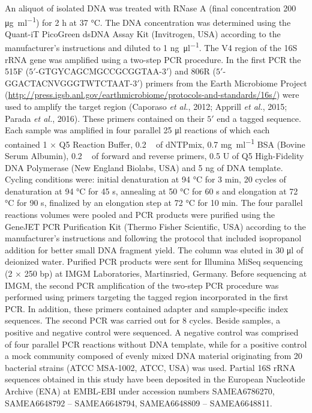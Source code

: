 \documentclass[12pt,]{article}
\begin{document}
An aliquot of isolated DNA was treated with RNase A (final concentration
200 \si{\ug\per\ml}) for 2 \si{\hour} at 37 \si{\degreeCelsius}. The DNA
concentration was determined using the Quant-iT PicoGreen dsDNA Assay
Kit (Invitrogen, USA) according to the manufacturer's instructions and
diluted to 1 \si{\ng\per\ul}. The V4 region of the 16S rRNA gene was
amplified using a two-step PCR procedure. In the first PCR the 515F
(\(5'\)-GTGYCAGCMGCCGCGGTAA-\(3'\)) and 806R
(\(5'\)-GGACTACNVGGGTWTCTAAT-\(3'\)) primers from the Earth Microbiome
Project
(\url{http://press.igsb.anl.gov/earthmicrobiome/protocols-and-standards/16s/})
were used to amplify the target region (Caporaso \emph{et al.}, 2012;
Apprill \emph{et al.}, 2015; Parada \emph{et al.}, 2016). These primers
contained on their \(5'\) end a tagged sequence. Each sample was
amplified in four parallel 25 \si{\ul} reactions of which each contained
1 × Q5 Reaction Buffer, 0.2 \si{\milli\Molar} of dNTPmix, 0.7
\si{\mg\per\ml} BSA (Bovine Serum Albumin), 0.2 \si{\micro\Molar} of
forward and reverse primers, 0.5 U of Q5 High-Fidelity DNA Polymerase
(New England Biolabs, USA) and 5 \si{\ng} of DNA template. Cycling
conditions were: initial denaturation at 94 \si{\degreeCelsius} for 3
\si{\minute}, 20 cycles of denaturation at 94 \si{\degreeCelsius} for 45
\si{\s}, annealing at 50 \si{\degreeCelsius} for 60 \si{\s} and
elongation at 72 \si{\degreeCelsius} for 90 \si{\s}, finalized by an
elongation step at 72 \si{\degreeCelsius} for 10 \si{\minute}. The four
parallel reactions volumes were pooled and PCR products were purified
using the GeneJET PCR Purification Kit (Thermo Fisher Scientific, USA)
according to the manufacturer's instructions and following the protocol
that included isopropanol addition for better small DNA fragment yield.
The column was eluted in 30 \si{\ul} of deionized water. Purified PCR
products were sent for Illumina MiSeq sequencing (2 × 250 bp) at IMGM
Laboratories, Martinsried, Germany. Before sequencing at IMGM, the
second PCR amplification of the two-step PCR procedure was performed
using primers targeting the tagged region incorporated in the first PCR.
In addition, these primers contained adapter and sample-specific index
sequences. The second PCR was carried out for 8 cycles. Beside samples,
a positive and negative control were sequenced. A negative control was
comprised of four parallel PCR reactions without DNA template, while for
a positive control a mock community composed of evenly mixed DNA
material originating from 20 bacterial strains (ATCC MSA-1002, ATCC,
USA) was used. Partial 16S rRNA sequences obtained in this study have
been deposited in the European Nucleotide Archive (ENA) at EMBL-EBI
under accession numbers SAMEA6786270, SAMEA6648792 -- SAMEA6648794,
SAMEA6648809 -- SAMEA6648811.
\end{document}
